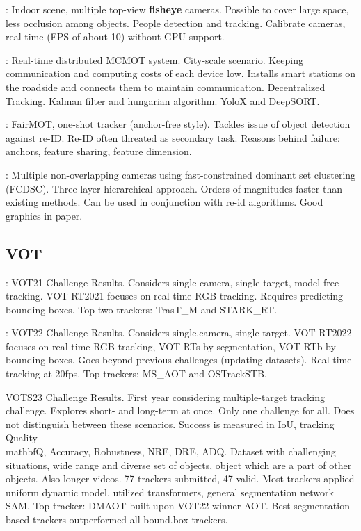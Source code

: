 \cite{Wang21}: Indoor scene, multiple top-view \textbf{fisheye} cameras. Possible to cover large space, less occlusion among objects. People detection and tracking. Calibrate cameras, real time (FPS of about 10) without GPU support.

\cite{Chen22}: Real-time distributed MCMOT system. City-scale scenario. Keeping communication and computing costs of each device low. Installs smart stations on the roadside and connects them to maintain communication. Decentralized Tracking. Kalman filter and hungarian algorithm. YoloX and DeepSORT.

\cite{Zhang21}: FairMOT, one-shot tracker (anchor-free style). Tackles issue of object detection against re-ID. Re-ID often threated as secondary task. Reasons behind failure: anchors, feature sharing, feature dimension.

\cite{Tesfaye19}: Multiple non-overlapping cameras using fast-constrained dominant set clustering (FCDSC). Three-layer hierarchical approach. Orders of magnitudes faster than existing methods. Can be used in conjunction with re-id algorithms. Good graphics in paper.

\subsection{VOT}

\cite{Kristan21}: VOT21 Challenge Results. Considers single-camera, single-target, model-free tracking. VOT-RT2021 focuses on real-time RGB tracking. Requires predicting bounding boxes. Top two trackers: TrasT\_M and STARK\_RT.

\cite{Kristan22}: VOT22 Challenge Results. Considers single.camera, single-target. VOT-RT2022 focuses on real-time RGB tracking, VOT-RTs by segmentation, VOT-RTb by bounding boxes. Goes beyond previous challenges (updating datasets). Real-time tracking at 20fps. Top trackers: MS\_AOT and OSTrackSTB.

\cite{Kristan23} VOTS23 Challenge Results. First year considering multiple-target tracking challenge. Explores short- and long-term at once. Only one challenge for all. Does not distinguish between these scenarios. Success is measured in IoU, tracking Quality \\mathbf{Q}, Accuracy, Robustness, NRE, DRE, ADQ. Dataset with challenging situations, wide range and diverse set of objects, object which are a part of other objects.  Also longer videos. 77 trackers submitted, 47 valid. Most trackers applied uniform dynamic model, utilized transformers, general segmentation network SAM. Top tracker: DMAOT built upon VOT22 winner AOT. Best segmentation-based trackers outperformed all bound.box trackers.

